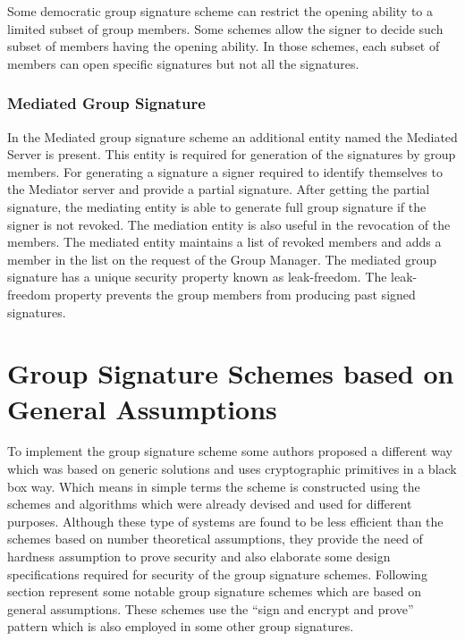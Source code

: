 Some democratic group signature scheme can restrict the opening ability to a limited subset of group members\cite{li2009}. Some schemes allow the signer to decide such subset of members having the opening ability\cite{li2009democratic}. In those schemes, each subset of members can open specific signatures but not all the signatures.

\subsubsection{Mediated Group Signature}
In the Mediated group signature scheme an additional entity named the Mediated Server is present\cite{ding2004leak}. This entity is required for generation of the signatures by group members. For generating a signature a signer required to identify themselves to the Mediator server and provide a partial signature. After getting the partial signature, the mediating entity is able to generate full group signature if the signer is not revoked. The mediation entity is also useful in the revocation of the members. The mediated entity maintains a list of revoked members and adds a member in the list on the request of the Group Manager. The mediated group signature has a unique security property known as leak-freedom. The leak-freedom property prevents the group members from producing past signed signatures.

\section[Group Signature Schemes based on General Assumptions]{Group Signature Schemes based on \\General Assumptions}
To implement the group signature scheme some authors proposed a different way which was based on generic solutions and uses cryptographic primitives in a black box way. Which means in simple terms the scheme is constructed using the schemes and algorithms which were already devised and used for different purposes. Although these type of systems are found to be less efficient than the schemes based on number theoretical assumptions, they provide the need of hardness assumption to prove security and also elaborate some design specifications required for security of the group signature schemes. Following section represent some notable group signature schemes which are based on general assumptions. These schemes use the \textquotedblleft sign and encrypt and prove\textquotedblright ~ pattern which is also employed in some other group signatures.

